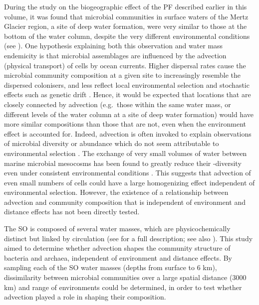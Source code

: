 During the study on the biogeographic effect of the \ac{PF} described earlier in this volume, it was found that microbial communities in surface waters of the Mertz Glacier region, a site of deep water formation, were very similar to those at the bottom of the water column, despite the very different environmental conditions (see ).
One hypothesis explaining both this observation and water mass endemicity is that microbial assemblages are influenced by the advection (physical transport) of cells by ocean currents. 
Higher dispersal rates cause the microbial community composition at a given site to increasingly resemble the dispersed colonisers, and less reflect local environmental selection and stochastic effects such as genetic drift \cite{Hanson:2012cb}.
Hence, it would be expected that locations that are closely connected by advection (e.g.\ those within the same water mass, or different levels of the water column at a site of deep water formation) would have more similar compositions than those that are not, even when the environment effect is accounted for.
Indeed, advection is often invoked to explain observations of microbial diversity or abundance which do not seem attributable to environmental selection \citep[e.g.][]{Sul:2013in, Ghiglione:2012ei, Giebel:2009hr, Lauro:2007bf}.
The exchange of very small volumes of water between marine microbial mesocosms has been found to greatly reduce their \textbeta-diversity even under consistent environmental conditions \cite{Declerck:2013cz}.
This suggests that advection of even small numbers of cells could have a large homogenizing effect independent of environmental selection.
However, the existence of a relationship between advection and community composition that is independent of environment and distance effects has not been directly tested.

The \ac{SO} is composed of several water masses, which are physicochemically distinct but linked by circulation (see  for a full description; see also ).
This study aimed to determine whether advection shapes the community structure of bacteria and archaea, independent of environment and distance effects.
By sampling each of the \ac{SO} water masses (depths from surface to \textapprox{}6 km), dissimilarity between microbial communities over a large spatial distance (\textapprox{}3000 km) and range of environments could be determined, in order to test whether advection played a role in shaping their composition.

